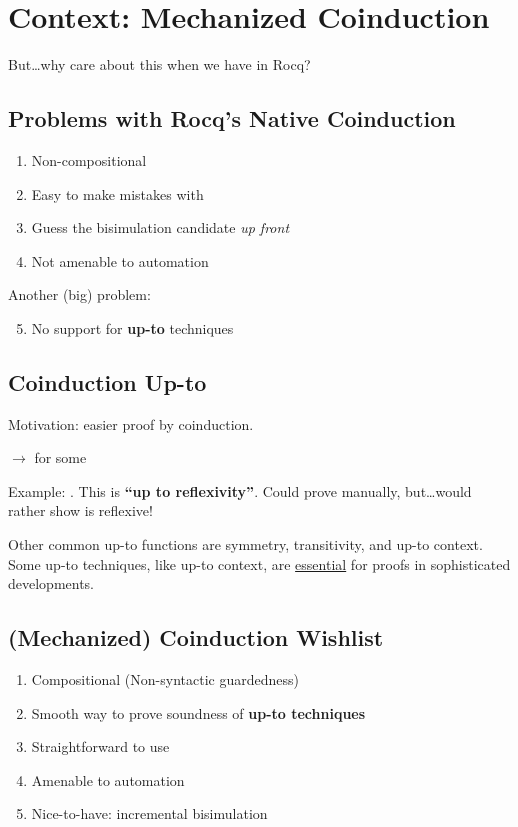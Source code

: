 \section{Context: Mechanized Coinduction}
\label{sec:mechanized}

But\ldots why care about this when we have  in Rocq?

\subsection{Problems with Rocq's Native Coinduction}

\begin{enumerate}
  \item Non-compositional
  \item Easy to make mistakes with 
  \item Guess the bisimulation candidate \emph{up front}
  \item Not amenable to automation
\end{enumerate}

Another (big) problem:
\begin{enumerate}\setcounter{enumi}{4}
  \item No support for \textbf{up-to} techniques
\end{enumerate}

\subsection{Coinduction Up-to}

Motivation: easier proof by coinduction.

 $\longrightarrow$  for some 

Example: . This is \textbf{``up to reflexivity''}. Could
prove manually, but\ldots would rather show \code{~} is reflexive!

Other common up-to functions are symmetry, transitivity, and up-to context.
Some up-to techniques, like up-to context, are \underline{essential} for proofs
in sophisticated developments.

\subsection{(Mechanized) Coinduction Wishlist}
\label{sec:wishlist}

\begin{enumerate}
  \item Compositional (Non-syntactic guardedness)
  \item Smooth way to prove soundness of \textbf{up-to techniques}
  \item Straightforward to use
  \item Amenable to automation
  \item Nice-to-have: incremental bisimulation
\end{enumerate}

